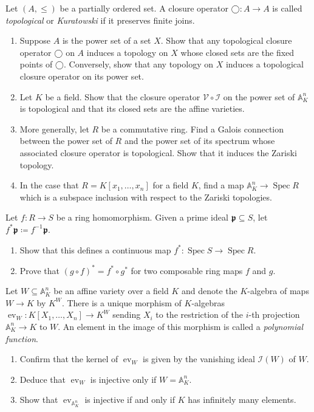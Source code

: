 \documentclass{exercises}
\DeclareMathOperator{\ev}{ev}
\DeclareMathOperator{\Spec}{Spec}
\begin{document}
\begin{exercise}
  Let $(A,≤)$ be a partially ordered set.
  A closure operator $◯:A → A$ is called \emph{topological} or \emph{Kuratowski} if it preserves finite joins.
  \begin{enumerate}
    \item Suppose $A$ is the power set of a set $X$.
      Show that any topological closure operator $◯$ on $A$ induces a topology on $X$ whose closed sets are the fixed points of $◯$.
      Conversely, show that any topology on $X$ induces a topological closure operator on its power set.
    \item Let $K$ be a field.
      Show that the closure operator $𝒱∘ℐ$ on the power set of $𝔸^n_K$ is topological and that its closed sets are the affine varieties.
    \item More generally, let $R$ be a commutative ring.
      Find a Galois connection between the power set of $R$ and the power set of its spectrum whose associated closure operator is topological.
      Show that it induces the Zariski topology.
    \item In the case that $R=K[x_1,\dots,x_n]$ for a field $K$, find a map $𝔸^n_K → \Spec R$ which is a subspace inclusion with respect to the Zariski topologies.
  \end{enumerate}
\end{exercise}

\begin{exercise}
  Let $f:R → S$ be a ring homomorphism.
  Given a prime ideal $𝖕⊆S$, let $f^*𝖕 \coloneqq f^{-1}𝖕$.
  \begin{enumerate}
    \item Show that this defines a continuous map $f^*:\Spec S → \Spec R$.
    \item Prove that $(g∘f)^*=f^*∘g^*$ for two composable ring maps $f$ and $g$.
  \end{enumerate}
\end{exercise}

\begin{exercise}
  Let $W⊆𝔸^n_K$ be an affine variety over a field $K$ and denote the $K$-algebra of maps $W → K$ by $K^W$.
  There is  a unique morphism of $K$-algebras $\ev_W:K[X_1,\dots,X_n] → K^W$ sending $X_i$ to the restriction of the $i$-th projection $𝔸^n_K → K$ to $W$.
  An element in the image of this morphism is called a \emph{polynomial function}.
  \begin{enumerate}
    \item Confirm that the kernel of $\ev_W$ is given by the vanishing ideal $ℐ(W)$ of $W$.
    \item Deduce that $\ev_W$ is injective only if $W=𝔸^n_K$.
    \item Show that $\ev_{𝔸^n_K}$ is injective if and only if $K$ has infinitely many elements.
  \end{enumerate}
\end{exercise}

\printbibliography
\end{document}
